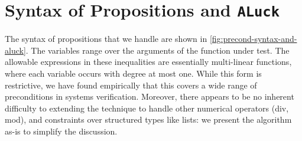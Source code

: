 \documentclass[sigconf,nonacm]{acmart}
\begin{document}


\section{Syntax of Propositions and \texttt{ALuck}}
\label{sec:luck}

The syntax of propositions that we handle are shown in
\autoref{fig:precond-syntax-and-aluck}. The variables range over
the arguments of the function under test. The allowable expressions in these inequalities are
essentially multi-linear functions, where each variable occurs with degree at
most one. While this form is restrictive, we have found empirically that this covers
a wide range of preconditions in systems verification. Moreover, there
appears to be no inherent difficulty to extending the technique to handle
other numerical operators (div, mod), and constraints over structured types like lists: we present the algorithm as-is to
simplify the discussion.
\end{document}
